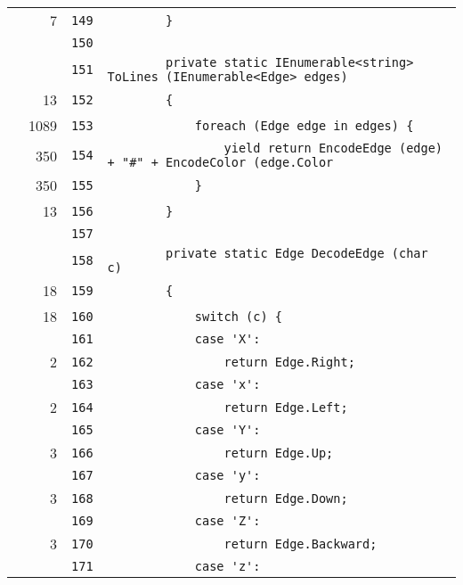 \documentclass[a4paper,10pt]{article}
\begin{document}
\begin{longtable}[l]{lrrl}
\cellcolor{green} & 7 & \verb~149~ & \verb~        }~\\
\cellcolor{gray} &  & \verb~150~ & \verb~~\\
\cellcolor{gray} &  & \verb~151~ & \verb~        private static IEnumerable<string> ToLines (IEnumerable<Edge> edges)~\\
\cellcolor{green} & 13 & \verb~152~ & \verb~        {~\\
\cellcolor{green} & 1089 & \verb~153~ & \verb~            foreach (Edge edge in edges) {~\\
\cellcolor{green} & 350 & \verb~154~ & \verb~                yield return EncodeEdge (edge) + "#" + EncodeColor (edge.Color~\\
\cellcolor{green} & 350 & \verb~155~ & \verb~            }~\\
\cellcolor{green} & 13 & \verb~156~ & \verb~        }~\\
\cellcolor{gray} &  & \verb~157~ & \verb~~\\
\cellcolor{gray} &  & \verb~158~ & \verb~        private static Edge DecodeEdge (char c)~\\
\cellcolor{green} & 18 & \verb~159~ & \verb~        {~\\
\cellcolor{green} & 18 & \verb~160~ & \verb~            switch (c) {~\\
\cellcolor{gray} &  & \verb~161~ & \verb~            case 'X':~\\
\cellcolor{green} & 2 & \verb~162~ & \verb~                return Edge.Right;~\\
\cellcolor{gray} &  & \verb~163~ & \verb~            case 'x':~\\
\cellcolor{green} & 2 & \verb~164~ & \verb~                return Edge.Left;~\\
\cellcolor{gray} &  & \verb~165~ & \verb~            case 'Y':~\\
\cellcolor{green} & 3 & \verb~166~ & \verb~                return Edge.Up;~\\
\cellcolor{gray} &  & \verb~167~ & \verb~            case 'y':~\\
\cellcolor{green} & 3 & \verb~168~ & \verb~                return Edge.Down;~\\
\cellcolor{gray} &  & \verb~169~ & \verb~            case 'Z':~\\
\cellcolor{green} & 3 & \verb~170~ & \verb~                return Edge.Backward;~\\
\cellcolor{gray} &  & \verb~171~ & \verb~            case 'z':~\\

\end{longtable}
\end{document}
